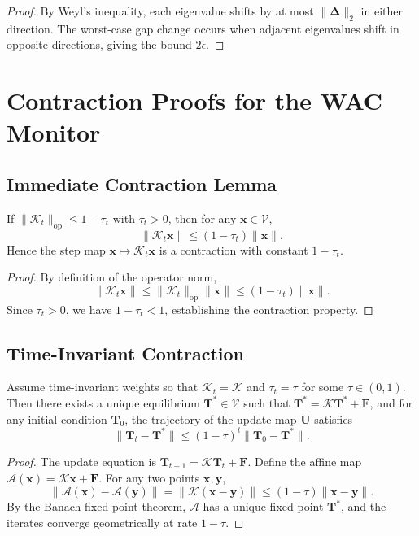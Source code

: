 \documentclass[11pt]{article}
\begin{document}
\begin{proof}
By Weyl's inequality, each eigenvalue shifts by at most $\|\boldsymbol{\Delta}\|_2$ in either direction. The worst-case gap change occurs when adjacent eigenvalues shift in opposite directions, giving the bound $2\epsilon$.
\end{proof}

\section{Contraction Proofs for the WAC Monitor}

\subsection{Immediate Contraction Lemma}

\begin{lemma}
If $\|\mathcal{K}_t\|_{\mathrm{op}} \leq 1 - \tau_t$ with $\tau_t > 0$, then for any $\mathbf{x} \in \mathcal{V}$,
\[
\|\mathcal{K}_t \mathbf{x}\| \leq (1 - \tau_t)\|\mathbf{x}\|.
\]
Hence the step map $\mathbf{x} \mapsto \mathcal{K}_t \mathbf{x}$ is a contraction with constant $1 - \tau_t$.
\end{lemma}

\begin{proof}
By definition of the operator norm,
\[
\|\mathcal{K}_t \mathbf{x}\| \leq \|\mathcal{K}_t\|_{\mathrm{op}} \|\mathbf{x}\| \leq (1 - \tau_t)\|\mathbf{x}\|.
\]
Since $\tau_t > 0$, we have $1 - \tau_t < 1$, establishing the contraction property.
\end{proof}

\subsection{Time-Invariant Contraction}

\begin{theorem}
Assume time-invariant weights so that $\mathcal{K}_t = \mathcal{K}$ and $\tau_t = \tau$ for some $\tau \in (0,1)$. Then there exists a unique equilibrium $\mathbf{T}^* \in \mathcal{V}$ such that $\mathbf{T}^* = \mathcal{K}\mathbf{T}^* + \mathbf{F}$, and for any initial condition $\mathbf{T}_0$, the trajectory of the update map $\mathbf{U}$ satisfies
\[
\|\mathbf{T}_t - \mathbf{T}^*\| \leq (1 - \tau)^t \|\mathbf{T}_0 - \mathbf{T}^*\|.
\]
\end{theorem}

\begin{proof}
The update equation is $\mathbf{T}_{t+1} = \mathcal{K}\mathbf{T}_t + \mathbf{F}$. Define the affine map $\mathcal{A}(\mathbf{x}) = \mathcal{K}\mathbf{x} + \mathbf{F}$. For any two points $\mathbf{x}, \mathbf{y}$,
\[
\|\mathcal{A}(\mathbf{x}) - \mathcal{A}(\mathbf{y})\| = \|\mathcal{K}(\mathbf{x} - \mathbf{y})\| \leq (1 - \tau)\|\mathbf{x} - \mathbf{y}\|.
\]
By the Banach fixed-point theorem, $\mathcal{A}$ has a unique fixed point $\mathbf{T}^*$, and the iterates converge geometrically at rate $1 - \tau$.
\end{proof}
\end{document}
